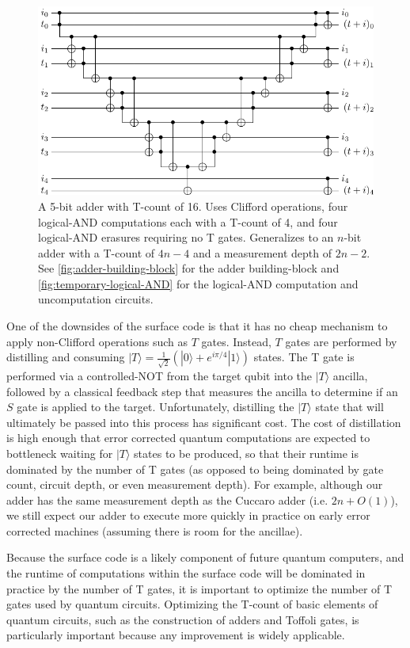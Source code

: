 \documentclass[twocolumn]{quantumarticle-customized}
\begin{document}
\begin{figure}
  \includegraphics[width=\linewidth]{adder.pdf}
  \caption{
	A 5-bit adder with T-count of 16.
	Uses Clifford operations, four logical-AND computations each with a T-count of 4, and four logical-AND erasures requiring no T gates.
	Generalizes to an $n$-bit adder with a T-count of $4n - 4$ and a measurement depth of $2n - 2$.
	See \autoref{fig:adder-building-block} for the adder building-block and \autoref{fig:temporary-logical-AND} for the logical-AND computation and uncomputation circuits.
  }
  \label{fig:adder}
\end{figure}

One of the downsides of the surface code is that it has no cheap mechanism to apply non-Clifford operations such as $T$ gates.
Instead, $T$ gates are performed by distilling and consuming $|T\rangle = \frac{1}{\sqrt{2}} (|0\rangle + e^{i \pi/4} |1\rangle)$ states.
The T gate is performed via a controlled-NOT from the target qubit into the $|T\rangle$ ancilla, followed by a classical feedback step that measures the ancilla to determine if an $S$ gate is applied to the target.
Unfortunately, distilling the $|T\rangle$ state that will ultimately be passed into this process has significant cost.
The cost of distillation is high enough that error corrected quantum computations are expected to bottleneck waiting for $|T\rangle$ states to be produced, so that their runtime is dominated by the number of T gates (as opposed to being dominated by gate count, circuit depth, or even measurement depth).
For example, although our adder has the same measurement depth as the Cuccaro adder (i.e. $2n + O(1)$), we still expect our adder to execute more quickly in practice on early error corrected machines (assuming there is room for the ancillae).

Because the surface code is a likely component of future quantum computers, and the runtime of computations within the surface code will be dominated in practice by the number of T gates, it is important to optimize the number of T gates used by quantum circuits.
Optimizing the T-count of basic elements of quantum circuits, such as the construction of adders and Toffoli gates, is particularly important because any improvement is widely applicable.
\end{document}
